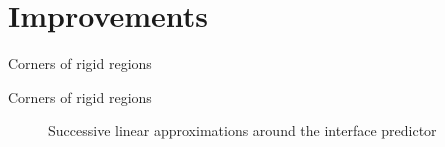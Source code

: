 \documentclass{beamer}  %
\begin{document}
\section{Improvements}
\begin{frame}{Corners of rigid regions}
    \begin{figure}
        \begin{overprint}
        \end{overprint}
    \end{figure}
\end{frame}

\begin{frame}{Corners of rigid regions}
    \begin{figure}
        \centering
        \begin{subfigure}[t]{0.26\textwidth}
            
        \end{subfigure}
        \begin{subfigure}[t]{0.26\textwidth}
            
        \end{subfigure}
        \begin{subfigure}[t]{0.26\textwidth}
            
        \end{subfigure}
        \caption*{Successive linear approximations around the interface predictor}
    \end{figure}
\end{frame}
\end{document}
